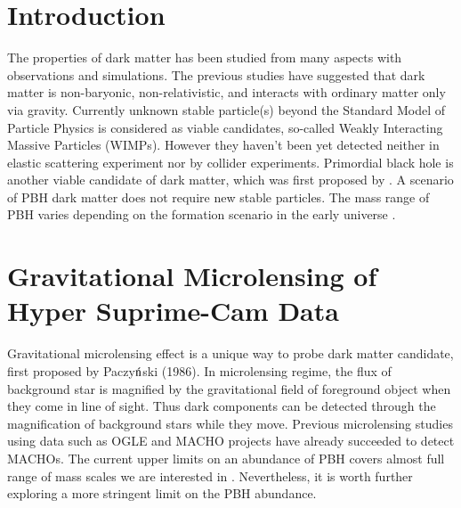 \documentclass[iop, apj]{emulateapj}
\newcommand{\?}{\stackrel{?}{=}}
\begin{document}
\section{Introduction}
The properties of dark matter has been studied from many aspects with 
observations and simulations. The previous studies have suggested that dark 
matter is non-baryonic, non-relativistic, and interacts with ordinary matter 
only via gravity. Currently unknown stable particle(s) beyond the Standard 
Model of Particle Physics is considered as viable candidates, so-called Weakly 
Interacting Massive Particles (WIMPs). However they haven't been yet detected 
neither in elastic scattering experiment nor by collider experiments. 
Primordial black hole is another viable candidate of dark matter, which was 
first proposed by \citet{Hawking:74}. A scenario of PBH dark matter does not 
require new stable particles. The mass range of PBH varies depending on the 
formation scenario in the early universe \citep{Carretal:10}. 


\section{Gravitational Microlensing of Hyper Suprime-Cam Data}%
Gravitational microlensing effect is a unique way to probe dark matter candidate, first proposed by Paczy${\rm \acute{n}}$ski (1986). In microlensing regime, the flux of background star is magnified by the gravitational field of foreground object when they come in line of sight. Thus dark components can be detected through the magnification of background stars while they move. 
Previous microlensing studies using data such as OGLE and MACHO projects have already succeeded to detect MACHOs. The current upper limits on an abundance of PBH covers almost full range of mass scales we are interested in \citep{Capelaetal:13b}. Nevertheless, it is worth further exploring a more stringent limit on the PBH abundance. 
\end{document}
